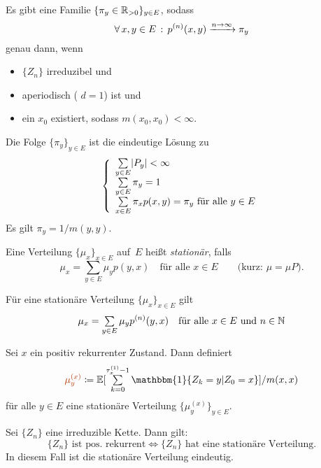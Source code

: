 \documentclass{cheat-sheet}
\newcommand{\E}{\mathbb{E}} %
\newcommand{\ind}{\mathbbm{1}} %
\newcommand{\Defn}[1]{\textcolor{DefinitionColor}{#1}}
\begin{document}
\begin{satz}
  Es gibt eine Familie $\{ \pi_y \in \mathbb{R}_{> 0} \}_{y \in E}$, sodass
  \[ \forall \, {x, y \in E} \,:\, p^{(n)}(x, y) \xrightarrow{n \to \infty} \pi_y \]
  genau dann, wenn
  \begin{itemize}
    \item $\{ Z_n \}$ irreduzibel und
    \item aperiodisch (\dh{} $d = 1$) ist und
    \item ein $x_0$ existiert, sodass $m(x_0, x_0) < \infty$.
  \end{itemize}
  Die Folge $\{ \pi_y \}_{y \in E}$ ist die eindeutige Lösung zu
  \[
    \left\{
      \begin{array}{l}
        \sum_{y \in E} \abs{P_y} < \infty \\
        \sum_{y \in E} \pi_y = 1 \\
        \sum_{x \in E} \pi_x p(x, y) = \pi_y \text{ für alle } y \in E
      \end{array}
    \right.
  \]
  Es gilt $\pi_y = 1/m(y,y)$.
\end{satz}


\begin{defn}
  Eine Verteilung $\{ \mu_x \}_{x \in E}$ auf~$E$ heißt \emph{stationär}, falls
  \[
    \mu_x = \sum_{y \in E} \mu_y p(y, x)
    \quad \text{für alle $x \in E$}
    \qquad \text{(kurz: $\mu = \mu P$).}
  \]
\end{defn}

\begin{bem}
  Für eine stationäre Verteilung $\{ \mu_x \}_{x \in E}$ gilt
  \[
    \mu_x = \sum_{y \in E} \mu_y p^{(n)}(y, x)
    \quad \text{für alle $x \in E$ und $n \in \N$}
  \]
\end{bem}

\begin{lem}
  Sei $x$ ein positiv rekurrenter Zustand.
  Dann definiert
  \[
    \Defn{\mu_y^{(x)}} \coloneqq \E[ \sum_{k=0}^{\tau_x^{(1)} - 1} \ind \{ Z_k = y | Z_0 = x \} ] / m(x, x)
  \]
  für alle $y \in E$ eine stationäre Verteilung $\{ \mu_y^{(x)} \}_{y \in E}$.
\end{lem}

\begin{satz}
  Sei $\{ Z_n \}$ eine irreduzible Kette.
  Dann gilt:
  \[
    \{ Z_n \} \text{ ist pos. rekurrent} \iff
    \{ Z_n \} \text{ hat eine stationäre Verteilung.}
  \]
  In diesem Fall ist die stationäre Verteilung eindeutig.
\end{satz}
\end{document}
